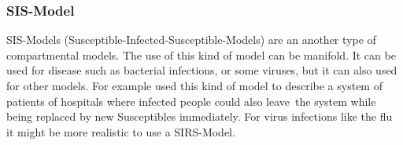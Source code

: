 \subsubsection{SIS-Model}
SIS-Models (Susceptible-Infected-Susceptible-Models) are an another type of compartmental models. The use of this kind of model can be manifold. It can be used for disease such as bacterial infections, or some viruses, but it can also used for other models. For example \citep{BEL16} used this kind of model to describe a system of patients of hospitals where infected people could also \glqq leave\grqq\ the system while being replaced by new Susceptibles immediately. For virus infections like the flu it might be more realistic to use a SIRS-Model.